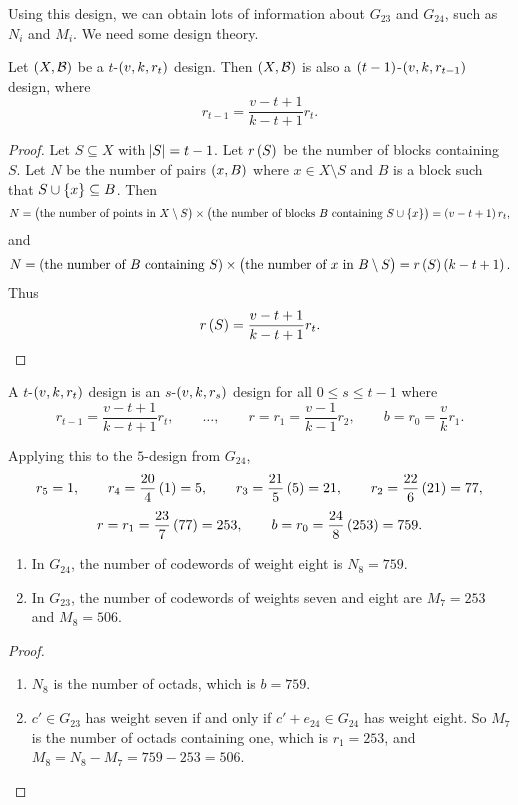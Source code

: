Using this design, we can obtain lots of information about $ G_{23} $ and $ G_{24} $, such as $ N_i $ and $ M_i $. We need some design theory.

\begin{proposition}
Let $ \br{X, \BB} $ be a $ t $-$ \br{v, k, r_t} $ design. Then $ \br{X, \BB} $ is also a $ \br{t - 1} $-$ \br{v, k, r_{t - 1}} $ design, where
$$ r_{t - 1} = \dfrac{v - t + 1}{k - t + 1}r_t. $$
\end{proposition}

\begin{proof}
Let $ S \subseteq X $ with $ \abs{S} = t - 1 $. Let $ r\br{S} $ be the number of blocks containing $ S $. Let $ N $ be the number of pairs $ \br{x, B} $ where $ x \in X \setminus S $ and $ B $ is a block such that $ S \cup \cbr{x} \subseteq B $. Then
$$ N = \br{\text{the number of points in} \ X \setminus S} \times \br{\text{the number of blocks} \ B \ \text{containing} \ S \cup \cbr{x}} = \br{v - t + 1}r_t, $$
and
$$ N = \br{\text{the number of} \ B \ \text{containing} \ S} \times \br{\text{the number of} \ x \ \text{in} \ B \setminus S} = r\br{S}\br{k - t + 1}. $$
Thus
$$ r\br{S} = \dfrac{v - t + 1}{k - t + 1}r_t. $$
\end{proof}

\begin{corollary}
\label{cor:1.24}
A $ t $-$ \br{v, k, r_t} $ design is an $ s $-$ \br{v, k, r_s} $ design for all $ 0 \le s \le t - 1 $ where
$$ r_{t - 1} = \dfrac{v - t + 1}{k - t + 1}r_t, \qquad \dots, \qquad r = r_1 = \dfrac{v - 1}{k - 1}r_2, \qquad b = r_0 = \dfrac{v}{k}r_1. $$
\end{corollary}

Applying this to the $ 5 $-design from $ G_{24} $,
$$ r_5 = 1, \qquad r_4 = \dfrac{20}{4}\br{1} = 5, \qquad r_3 = \dfrac{21}{5}\br{5} = 21, \qquad r_2 = \dfrac{22}{6}\br{21} = 77, $$
$$ r = r_1 = \dfrac{23}{7}\br{77} = 253, \qquad b = r_0 = \dfrac{24}{8}\br{253} = 759. $$

\begin{proposition}
\hfill
\begin{enumerate}
\item In $ G_{24} $, the number of codewords of weight eight is $ N_8 = 759 $.
\item In $ G_{23} $, the number of codewords of weights seven and eight are $ M_7 = 253 $ and $ M_8 = 506 $.
\end{enumerate}
\end{proposition}

\begin{proof}
\hfill
\begin{enumerate}
\item $ N_8 $ is the number of octads, which is $ b = 759 $.
\item $ c' \in G_{23} $ has weight seven if and only if $ c' + e_{24} \in G_{24} $ has weight eight. So $ M_7 $ is the number of octads containing one, which is $ r_1 = 253 $, and $ M_8 = N_8 - M_7 = 759 - 253 = 506 $.
\end{enumerate}
\end{proof}

